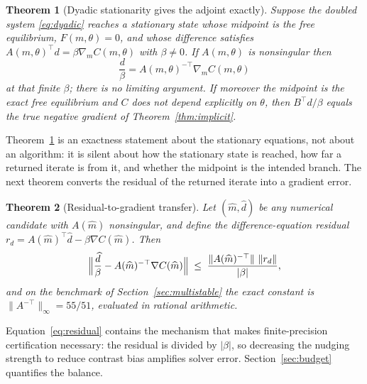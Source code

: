 \documentclass[11pt]{article}
\newtheorem{theorem}{Theorem}
\theoremstyle{definition}
\theoremstyle{remark}
\newcommand{\abs}[1]{\lvert #1 \rvert}
\newcommand{\grad}{\nabla}
\begin{document}
\begin{theorem}[Dyadic stationarity gives the adjoint exactly]\label{thm:dyadic}
Suppose the doubled system \eqref{eq:dyadic} reaches a stationary state whose midpoint is the
free equilibrium, $F(m,\theta) = 0$, and whose difference satisfies
$A(m,\theta)^{\top}d = \beta \grad_m C(m,\theta)$ with $\beta \neq 0$. If $A(m,\theta)$ is
nonsingular then
\begin{equation}
\boxed{\ \frac{d}{\beta} = A(m,\theta)^{-\top} \grad_m C(m,\theta)\ }
\label{eq:dyadic-exact}
\end{equation}
at that finite $\beta$; there is no limiting argument. If moreover the midpoint is the exact
free equilibrium and $C$ does not depend explicitly on $\theta$, then $B^{\top}d/\beta$ equals the
true negative gradient of Theorem~\ref{thm:implicit}.
\end{theorem}

Theorem~\ref{thm:dyadic} is an exactness statement about the stationary equations, not about an
algorithm: it is silent about how the stationary state is reached, how far a returned iterate is
from it, and whether the midpoint is the intended branch. The next theorem converts the residual
of the returned iterate into a gradient error.

\begin{theorem}[Residual-to-gradient transfer]\label{thm:residual}
Let $(\widehat m, \widehat d)$ be any numerical candidate with $A(\widehat m)$ nonsingular, and
define the difference-equation residual
$r_d = A(\widehat m)^{\top}\widehat d - \beta \grad C(\widehat m)$. Then
\begin{equation}
\Bigl\lVert \frac{\widehat d}{\beta} - A(\widehat m)^{-\top} \grad C(\widehat m) \Bigr\rVert
\;\le\; \frac{\lVert A(\widehat m)^{-\top}\rVert\ \lVert r_d \rVert}{\abs{\beta}} ,
\label{eq:residual}
\end{equation}
and on the benchmark of Section~\ref{sec:multistable} the exact constant is
$\lVert A^{-\top}\rVert_{\infty} = 55/51$, evaluated in rational arithmetic.
\end{theorem}

Equation~\eqref{eq:residual} contains the mechanism that makes finite-precision certification
necessary: the residual is divided by $\abs{\beta}$, so decreasing the nudging strength to reduce
contrast bias amplifies solver error. Section~\ref{sec:budget} quantifies the balance.
\end{document}
